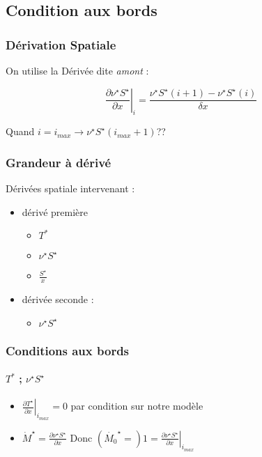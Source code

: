 \subsection{Condition aux bords}


\begin{frame}
\frametitle{Dérivation Spatiale}

On utilise la Dérivée dite \textit{amont} : 

\begin{equation*}
\left. \frac{\partial \nu^{\star} S^{\star}}{\partial x} \right|_i = \frac{\nu^{\star}S^{\star}(i+1)-\nu^{\star}S^{\star}(i)}{\delta x} 
\end{equation*}


Quand $i=i_{max} \rightarrow \nu^{\star}S^{\star}(i_{max}+1) $??

\end{frame}


\begin{frame}
\frametitle{Grandeur à dérivé}
Dérivées spatiale intervenant :

\begin{itemize}
    \item dérivé première
    \begin{itemize}
        \item $T^*$
        \item $ \nu^{\star}S^{\star}$
        \item $\frac{S^{\star}}{x}$
    \end{itemize}
    \item dérivée seconde :
    \begin{itemize}
        \item $ \nu^{\star}S^{\star}$
    \end{itemize}
\end{itemize}

\end{frame}


\begin{frame}
\frametitle{Conditions aux bords}
\framesubtitle{$T^*$ ; $\nu^{\star} S^{\star}$}

\begin{itemize}

\item $\left.\frac{\partial T^{\star}}{\partial x}\right|_{i_{max}} =0$ par condition sur notre modèle

\item $\dot{M}^{\star} = \frac{\partial \nu^{\star} S^{\star}}{\partial x}$ Donc $ (\dot{M_0}^{\star} =)1= \left. \frac{\partial \nu^{\star} S^{\star}}{\partial x} \right|_{i_{max}} $

\end{itemize}

\end{frame}


